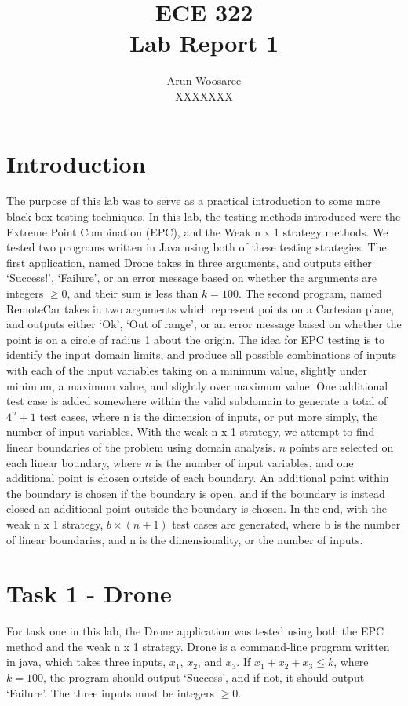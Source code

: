 \documentclass[letterpaper]{article}
\title{ECE 322 \\
Lab Report 1}
\author{Arun Woosaree\\
XXXXXXX}
\begin{document}
\maketitle
\section{Introduction} The purpose of this lab was to serve as a practical
introduction to some more black box testing techniques. In this lab, the
testing methods introduced were the Extreme Point Combination (EPC), and the
Weak n x 1 strategy methods. We tested two programs written in Java using both
of these testing strategies. The first application, named Drone takes in three
arguments, and outputs either `Success!', `Failure', or an error message based
on whether the arguments are integers $\geq 0$, and their sum is less than
$k=100$. The second program, named RemoteCar takes in two arguments which
represent points on a Cartesian plane, and outputs either `Ok', `Out of range',
or an error message based on whether the point is on a circle of radius 1 about
the origin. The idea for EPC testing is to identify the input domain limits,
and produce all possible combinations of inputs with each of the input
variables taking on a minimum value, slightly under minimum, a maximum value,
and slightly over maximum value. One additional test case is added somewhere
within the valid subdomain to generate a total of $4^n + 1$ test cases, where
n is the dimension of inputs, or put more simply, the number of input
variables. With the weak n x 1 strategy, we attempt to find linear boundaries 
of the problem using domain analysis. $n$ points are selected on each linear
boundary, where $n$ is the number of input variables, and one additional point 
is chosen outside of each boundary. An additional point within the boundary is
chosen if the boundary is open, and if the boundary is instead closed an 
additional point outside the boundary is chosen. In the end, with the weak
n x 1 strategy, $b \times (n + 1)$ test cases are generated, where b is the 
number of linear boundaries, and n is the dimensionality, or the number of
inputs.

\section{Task 1 - Drone}
For task one in this lab, the Drone application was tested using both the
EPC method and the weak n x 1 strategy. Drone is a command-line program
written in java, which takes three inputs, $x_1$, $x_2$, and $x_3$.
If $x_1 + x_2 + x_3 \leq k$, where $k=100$, the program should output
`Success', and if not, it should output `Failure'. The three inputs 
must be integers $\geq 0$. 
\end{document}

